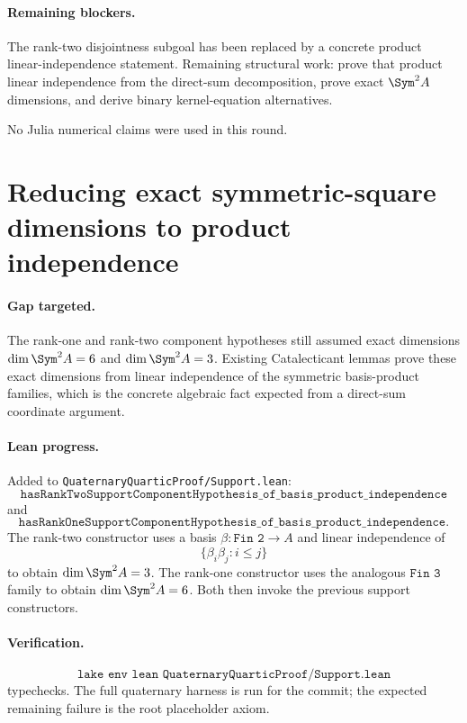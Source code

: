 \documentclass[11pt]{article}
\begin{document}
\paragraph{Remaining blockers.}
The rank-two disjointness subgoal has been replaced by a concrete product
linear-independence statement.  Remaining structural work: prove that product
linear independence from the direct-sum decomposition, prove exact
\(\Sym^2A\) dimensions, and derive binary kernel-equation alternatives.

No Julia numerical claims were used in this round.

\section*{Reducing exact symmetric-square dimensions to product independence}

\paragraph{Gap targeted.}
The rank-one and rank-two component hypotheses still assumed exact dimensions
\(\dim\Sym^2A=6\) and \(\dim\Sym^2A=3\).  Existing Catalecticant lemmas prove
these exact dimensions from linear independence of the symmetric basis-product
families, which is the concrete algebraic fact expected from a direct-sum
coordinate argument.

\paragraph{Lean progress.}
Added to \texttt{QuaternaryQuarticProof/Support.lean}:
\[
\texttt{hasRankTwoSupportComponentHypothesis\_of\_basis\_product\_independence}
\]
and
\[
\texttt{hasRankOneSupportComponentHypothesis\_of\_basis\_product\_independence}.
\]
The rank-two constructor uses a basis \(\beta:\texttt{Fin 2}\to A\) and
linear independence of
\[
\{\beta_i\beta_j:i\le j\}
\]
to obtain \(\dim\Sym^2A=3\).  The rank-one constructor uses the analogous
\(\texttt{Fin 3}\) family to obtain \(\dim\Sym^2A=6\).  Both then invoke the
previous support constructors.

\paragraph{Verification.}
\[
\texttt{lake env lean QuaternaryQuarticProof/Support.lean}
\]
typechecks.  The full quaternary harness is run for the commit; the expected
remaining failure is the root placeholder axiom.
\end{document}
